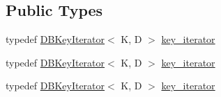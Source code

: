 \subsection*{Public Types}
\begin{DoxyCompactItemize}
\item 
typedef \mbox{\hyperlink{classFILEDB_1_1DBKeyIterator}{D\+B\+Key\+Iterator}}$<$ K, D $>$ \mbox{\hyperlink{classFILEDB_1_1AllConfStoreDB_a2ce8981ca7049ed0c2c6e438873a9c1b}{key\+\_\+iterator}}
\item 
typedef \mbox{\hyperlink{classFILEDB_1_1DBKeyIterator}{D\+B\+Key\+Iterator}}$<$ K, D $>$ \mbox{\hyperlink{classFILEDB_1_1AllConfStoreDB_a2ce8981ca7049ed0c2c6e438873a9c1b}{key\+\_\+iterator}}
\item 
typedef \mbox{\hyperlink{classFILEDB_1_1DBKeyIterator}{D\+B\+Key\+Iterator}}$<$ K, D $>$ \mbox{\hyperlink{classFILEDB_1_1AllConfStoreDB_a2ce8981ca7049ed0c2c6e438873a9c1b}{key\+\_\+iterator}}
\end{DoxyCompactItemize}
